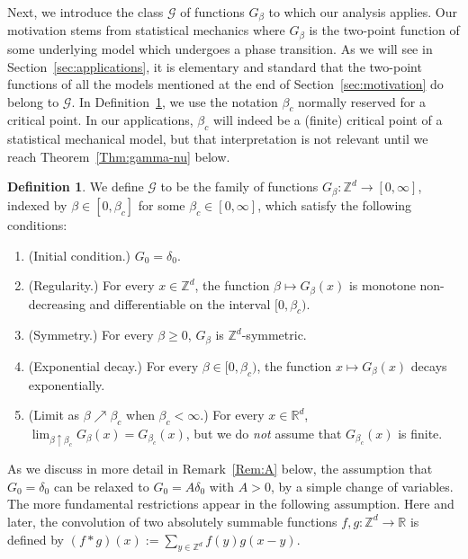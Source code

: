 \documentclass[11pt,a4paper]{article}
\numberwithin{equation}{section}
\theoremstyle{plain}
\theoremstyle{definition}
\newtheorem{Def}[Thm]{Definition}
\newcommand\1{\mathds{1}}
\begin{document}
Next, we introduce the class $\mathcal G$ of functions $G_\beta$ to which our analysis applies.
Our motivation stems from statistical mechanics where $G_\beta$ is the two-point function of some underlying model which undergoes a phase transition.
As we will see in Section~\ref{sec:applications}, it is elementary and standard that
the two-point functions of
all the models mentioned at the end of Section~\ref{sec:motivation} do belong to $\mathcal G$.
In Definition~\ref{Def:G}, we use the notation $\beta_c$ normally reserved for
a critical point.  In our applications, $\beta_c$ will indeed be a (finite)
critical point of a statistical mechanical model, but that interpretation is
not relevant until we reach Theorem~\ref{Thm:gamma-nu} below.

\begin{Def}
\label{Def:G}
We define $\mathcal G$ to be the family of functions
$G_\beta:\mathbb Z^d\rightarrow [0,\infty]$, indexed by $\beta \in [0,\beta_c]$
for some $\beta_c\in [0,\infty]$,
which satisfy the following conditions:
\begin{enumerate}
	\item[$(i)$] (Initial condition.) $G_0=\delta_{0}$.
	\item[$(ii)$] (Regularity.) For every $x\in \mathbb Z^d$, the function
    $\beta\mapsto G_\beta(x)$  is monotone
    non-decreasing and differentiable on the interval $[0,\beta_c)$.
	\item[$(iii)$] (Symmetry.) For every $\beta\geq 0$, $G_\beta$ is $\mathbb Z^d$-symmetric.
	\item[$(iv)$] (Exponential decay.)
	 For every
    $\beta\in [0,\beta_c)$, the function $x \mapsto G_\beta(x)$
    decays exponentially.
    \item[$(v)$] (Limit as $\beta\nearrow\beta_c$ when $\beta_c<\infty$.)  For every $x\in\mathbb R^d$, $\lim_{\beta \uparrow \beta_c}G_{\beta}(x) = G_{\beta_c}(x)$, but
    we do \emph{not} assume that $G_{\beta_c}(x)$ is finite.
	\end{enumerate}
\end{Def}

As we discuss in more detail in Remark~\ref{Rem:A}
below, the assumption that $G_0=\delta_0$ can be
relaxed to $G_0=A\delta_0$ with $A>0$, by a simple change of variables.
The more fundamental restrictions appear in the following assumption.
Here and later, the convolution of two
absolutely summable functions $f,g:\mathbb Z^d\rightarrow \mathbb R$ is defined by
$(f*g)(x):=\sum_{y\in \mathbb Z^d}f(y)g(x-y)$.
\end{document}
